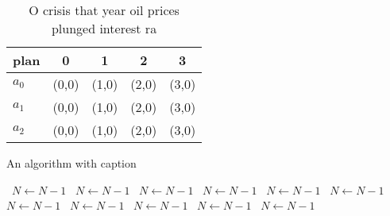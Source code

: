 \documentclass[a4paper]{article}
\begin{document}
\begin{table}
\begin{adjustbox}{width=0.6\columnwidth}
\begin{tabular}{|l|l|l|l|l|}
\hline
\textbf{plan} & \multicolumn{1}{c|}{\textbf{0}} & \multicolumn{1}{c|}{\textbf{1}} & \multicolumn{1}{c|}{\textbf{2}} & \multicolumn{1}{c|}{\textbf{3}} \\ \hline
\textbf{$a_0$}  & (0,0) & (1,0) & (2,0) & (3,0) \\ \hline
\textbf{$a_1$}  & (0,0) & (1,0) & (2,0) & (3,0) \\ \hline
\textbf{$a_2$}  & (0,0) & (1,0) & (2,0) & (3,0) \\ \hline
\end{tabular}
\end{adjustbox}
\caption{O crisis that year oil prices plunged interest ra
}
\end{table}

\begin{algorithm}
\caption{An algorithm with caption}
\begin{algorithmic}
\    \State $N \gets N - 1$
\    \State $N \gets N - 1$
\    \State $N \gets N - 1$
\    \State $N \gets N - 1$
\    \State $N \gets N - 1$
\    \State $N \gets N - 1$
\    \State $N \gets N - 1$
\    \State $N \gets N - 1$
\    \State $N \gets N - 1$
\    \State $N \gets N - 1$
\    \State $N \gets N - 1$
\EndWhile
\end{algorithmic}
\end{algorithm}
\end{document}
